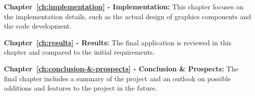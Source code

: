 \textbf{Chapter~\ref{ch:implementation} - Implementation:} This chapter focuses on the implementation details, such as
the actual design of graphics components and the code development.

\textbf{Chapter~\ref{ch:results} - Results:} The final application is reviewed in this chapter and compared to
the initial requirements.

\textbf{Chapter~\ref{ch:conclusion-&-prospects} - Conclusion \& Prospects:} The final chapter includes a summary of the project
and an outlook on possible additions and features to the project in the future.